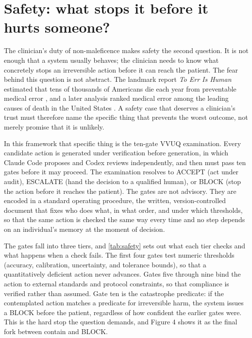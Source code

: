 \section{Safety: what stops it before it hurts someone?}
\label{sec:safety}

The clinician's duty of non-maleficence makes safety the second question. It is not
enough that a system usually behaves; the clinician needs to know what concretely
stops an irreversible action before it can reach the patient. The fear behind this
question is not abstract. The landmark report \textit{To Err Is Human} estimated
that tens of thousands of Americans die each year from preventable medical error
\cite{kohn2000toerr}, and a later analysis ranked medical error among the leading
causes of death in the United States \cite{makary2016medical}. A safety case that
deserves a clinician's trust must therefore name the specific thing that prevents
the worst outcome, not merely promise that it is unlikely.

In this framework that specific thing is the ten-gate VVUQ examination. Every
candidate action is generated under verification before generation, in which
Claude Code proposes and Codex reviews independently, and then must pass ten gates
before it may proceed. The examination resolves to ACCEPT (act under audit), ESCALATE (hand the
decision to a qualified human), or BLOCK (stop the action before it reaches the
patient). The gates are not advisory. They are encoded in a standard operating
procedure, the written, version-controlled document that fixes who does what, in
what order, and under which thresholds, so that the same action is checked the same
way every time and no step depends on an individual's memory at the moment of
decision.

The gates fall into three tiers, and \autoref{tab:safety} sets out what each tier
checks and what happens when a check fails. The first four gates test numeric
thresholds (accuracy, calibration, uncertainty, and tolerance bounds), so that a
quantitatively deficient action never advances. Gates five through nine bind the
action to external standards and protocol constraints, so that compliance is
verified rather than assumed. Gate ten is the catastrophe predicate: if the
contemplated action matches a predicate for irreversible harm, the system issues a
BLOCK before the patient, regardless of how confident the earlier gates were. This
is the hard stop the question demands, and Figure 4 shows it as the final fork
between contain and BLOCK.

